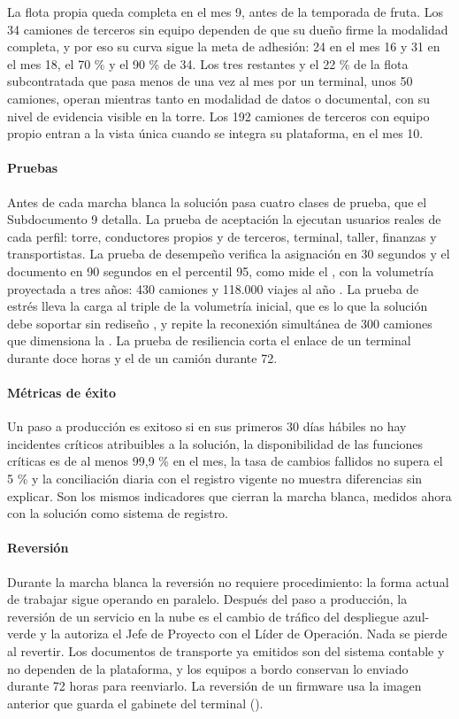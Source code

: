 La flota propia queda completa en el mes 9, antes de la temporada de fruta. Los 34 camiones de terceros
sin equipo dependen de que su dueño firme la modalidad completa, y por eso su curva sigue la meta de
adhesión: 24 en el mes 16 y 31 en el mes 18, el 70 \% y el 90 \% de 34. Los tres restantes y el 22 \% de la
flota subcontratada que pasa menos de una vez al mes por un terminal, unos 50 camiones, operan mientras
tanto en modalidad de datos o documental, con su nivel de evidencia visible en la torre. Los 192 camiones
de terceros con equipo propio entran a la vista única cuando se integra su plataforma, en el mes 10.

\paragraph{Pruebas}
Antes de cada marcha blanca la solución pasa cuatro clases de prueba, que el Subdocumento 9 detalla. La
prueba de aceptación la ejecutan usuarios reales de cada perfil: torre, conductores propios y de
terceros, terminal, taller, finanzas y transportistas. La prueba de desempeño verifica la asignación en
30 segundos y el documento en 90 segundos en el percentil 95, como mide el , con la
volumetría proyectada a tres años: 430 camiones y 118.000 viajes al año . La
prueba de estrés lleva la carga al triple de la volumetría inicial, que es lo que la solución debe
soportar sin rediseño , y repite la reconexión simultánea de 300 camiones que
dimensiona la . La prueba de resiliencia corta el enlace de un terminal
durante doce horas y el de un camión durante 72.

\paragraph{Métricas de éxito}
Un paso a producción es exitoso si en sus primeros 30 días hábiles no hay incidentes críticos atribuibles
a la solución, la disponibilidad de las funciones críticas es de al menos 99,9 \% en el mes, la tasa de
cambios fallidos no supera el 5 \%  y la conciliación diaria con el registro vigente no
muestra diferencias sin explicar. Son los mismos indicadores que cierran la marcha blanca, medidos ahora
con la solución como sistema de registro.

\paragraph{Reversión}
Durante la marcha blanca la reversión no requiere procedimiento: la forma actual de trabajar sigue
operando en paralelo. Después del paso a producción, la reversión de un servicio en la nube es el cambio
de tráfico del despliegue azul-verde y la autoriza el Jefe de Proyecto con el Líder de Operación. Nada se
pierde al revertir. Los documentos de transporte ya emitidos son del sistema contable y no dependen de la
plataforma, y los equipos a bordo conservan lo enviado durante 72 horas para reenviarlo. La reversión de
un firmware usa la imagen anterior que guarda el gabinete del terminal ().

